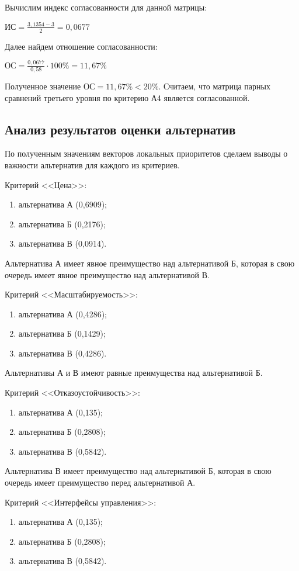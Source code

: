 Вычислим индекс согласованности для данной матрицы:

$\text{ИС} = \frac{3,1354 - 3}{2} = 0,0677$

Далее найдем отношение согласованности:

$\text{ОС} = \frac{0,0677}{0,58} \cdot 100\% = 11,67\%$

Полученное значение $\text{ОС} = 11,67\% < 20\%$.
Считаем, что матрица парных сравнений третьего уровня по критерию А4 является согласованной.

\subsection{Анализ результатов оценки альтернатив}

По полученным значениям векторов локальных приоритетов сделаем выводы о важности альтернатив для каждого из критериев.

Критерий <<Цена>>:
\begin{enumerate}
  \item альтернатива А (0,6909);
  \item альтернатива Б (0,2176);
  \item альтернатива В (0,0914).
\end{enumerate}

Альтернатива А имеет явное преимущество над альтернативой Б, которая в свою очередь имеет явное преимущество над альтернативой В.

Критерий <<Масштабируемость>>:
\begin{enumerate}
  \item альтернатива А (0,4286);
  \item альтернатива Б (0,1429);
  \item альтернатива В (0,4286).
\end{enumerate}

Альтернативы А и В имеют равные преимущества над альтернативой Б.

Критерий <<Отказоустойчивость>>:
\begin{enumerate}
  \item альтернатива А (0,135);
  \item альтернатива Б (0,2808);
  \item альтернатива В (0,5842).
\end{enumerate}

Альтернатива В имеет преимущество над альтернативой Б, которая в свою очередь имеет преимущество перед альтернативой А.

Критерий <<Интерфейсы управления>>:
\begin{enumerate}
  \item альтернатива А (0,135);
  \item альтернатива Б (0,2808);
  \item альтернатива В (0,5842).
\end{enumerate}

